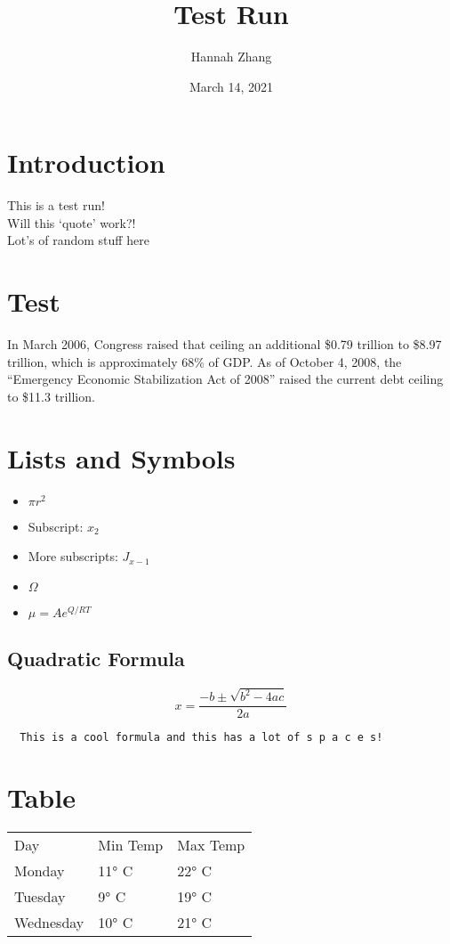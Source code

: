 \documentclass{article}
\title{\textbf{Test Run}}
\author{Hannah Zhang }
\date{March 14, 2021}
\begin{document}
\maketitle
\section{Introduction}
This is a test run! \\
Will this `quote' work?! \\
Lot's of random stuff here 

\section{Test}
In March 2006, Congress raised that ceiling an additional \$0.79
trillion to \$8.97 trillion, which is approximately 68\% of GDP. As of
October 4, 2008, the ``Emergency Economic Stabilization Act of
2008'' raised the current debt ceiling to \$11.3 trillion.

\section{Lists and Symbols}
\begin{itemize}  
  \item $\pi r^2$
  \item Subscript: $x_2$
  \item More subscripts: $J_{x-1}$
  \item $\Omega$
  \item $\mu = A e^{Q/RT}$
\end{itemize}

\subsection{Quadratic Formula}
\begin{equation*}
  x = \frac{-b \pm \sqrt{b^2 - 4ac}}{2a}
\end{equation*}
\begin{verbatim}
  This is a cool formula and this has a lot of s p a c e s!
\end{verbatim}

\section{Table}
\begin{tabular}{ l l l }
  Day       & Min Temp & Max Temp \\
  Monday    &    11° C &  22° C \\
  Tuesday   &     9° C &  19° C \\
  Wednesday &    10° C &  21° C \\
\end{tabular}
\end{document}
